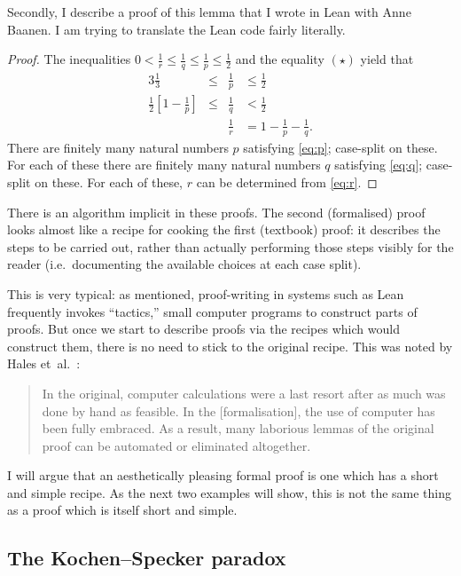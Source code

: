 \documentclass[runningheads]{llncs}
\begin{document}
Secondly, I describe a proof of this lemma that I wrote in Lean with Anne Baanen.
I am trying to translate the Lean code fairly literally.


\begin{proof}
The inequalities
$0<\frac{1}{r}\le \frac{1}{q} \le \frac{1}{p} \le \frac{1}{2}$ and the equality $(\star)$ yield that
\begin{alignat}{3}
  \tfrac{1}{3}&\le& \tfrac{1}{p}&\le \tfrac{1}{2}\label{eq:p}\\
  \tfrac{1}{2}\left[1-\tfrac{1}{p}\right]&\le &\tfrac{1}{q}&<\tfrac{1}{2}\label{eq:q}\\
  &&\tfrac{1}{r}&=1-\tfrac{1}{p}-\tfrac{1}{q}.\label{eq:r}
\end{alignat}
There are finitely many natural numbers $p$ satisfying \cref{eq:p}; case-split on these.
For each of these there are finitely many natural numbers $q$ satisfying \cref{eq:q}; case-split on these.
For each of these, $r$ can be determined from \cref{eq:r}.
\end{proof}

There is an algorithm implicit in these proofs.
The second (formalised) proof looks almost like a recipe for cooking the first (textbook) proof:
it describes the steps to be carried out,
rather than actually performing those steps visibly for the reader
(i.e.\ documenting the available choices at each case split).

This is very typical:
as mentioned, proof-writing in systems such as Lean frequently invokes ``tactics,''
small computer programs to construct parts of proofs.
But once we start to describe proofs via the recipes which would construct them,
there is no need to stick to the original recipe.
This was noted by Hales et~al.~\cite{Hal17}:
\begin{quote}
In the original, computer calculations were a last resort after as much was done by
hand as feasible. In the [formalisation], the use of computer has been fully embraced.
As a result, many laborious lemmas of the original proof can be automated or
eliminated altogether.
\end{quote}
I will argue that an aesthetically pleasing formal proof is one which has a short and simple recipe.
As the next two examples will show,
this is not the same thing as a proof which is itself short and simple.


\subsection{The Kochen--Specker paradox}
\end{document}
